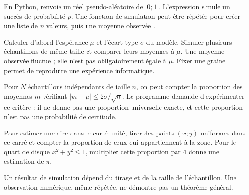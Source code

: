 \clearpage
{}
\begin{propriete}
En Python,  renvoie un réel pseudo-aléatoire de $[0;1[$.
L'expression  simule un succès de probabilité $p$.
Une fonction de simulation peut être répétée pour créer une liste de $n$ valeurs,
puis une moyenne observée .
\end{propriete}
\begin{savoirfaire}
Calculer d'abord l'espérance $\mu$ et l'écart type $\sigma$ du modèle.
Simuler plusieurs échantillons de même taille et comparer leurs moyennes à $\mu$.
Une moyenne observée fluctue ; elle n'est pas obligatoirement égale à $\mu$.
Fixer une graine permet de reproduire une expérience informatique.
\end{savoirfaire}
\begin{definition}
Pour $N$ échantillons indépendants de taille $n$, on peut compter la proportion
des moyennes $m$ vérifiant $|m-\mu|\leq2\sigma/\sqrt n$.
Le programme demande d'expérimenter ce critère : il ne donne pas une proportion
universelle exacte, et cette proportion n'est pas une probabilité de certitude.
\end{definition}
\begin{exemple}
Pour estimer une aire dans le carré unité, tirer des points $(x;y)$ uniformes
dans ce carré et compter la proportion de ceux qui appartiennent à la zone.
Pour le quart de disque $x^2+y^2\leq1$, multiplier cette proportion par 4
donne une estimation de $\pi$.
\end{exemple}
\begin{attention}
Un résultat de simulation dépend du tirage et de la taille de l'échantillon.
Une observation numérique, même répétée, ne démontre pas un théorème général.
\end{attention}

\exercices

